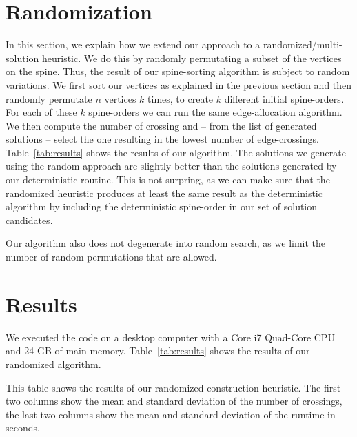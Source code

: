 \documentclass{scrartcl}
\begin{document}
\section{Randomization}
In this section, we explain how we extend our approach to a
randomized/multi-solution heuristic. We do this by randomly
permutating a subset of the vertices on the spine. Thus, the result of
our spine-sorting algorithm is subject to random variations. We first
sort our vertices as explained in the previous section and then
randomly permutate $n$ vertices $k$ times, to create $k$ different
initial spine-orders. For each of these $k$ spine-orders we can run
the same edge-allocation algorithm. We then compute the number of
crossing and -- from the list of generated solutions -- select the one
resulting in the lowest number of
edge-crossings. Table~\ref{tab:results} shows the results of our
algorithm. The solutions we generate using the random approach are
slightly better than the solutions generated by our deterministic
routine. This is not surpring, as we can make sure that the randomized
heuristic produces at least the same result as the deterministic
algorithm by including the deterministic spine-order in our set of
solution candidates.

Our algorithm also does not degenerate into random search, as we limit
the number of random permutations that are allowed.



\section{Results}
We executed the code on a desktop computer with a Core i7 Quad-Core
CPU and 24 GB of main memory. Table~\ref{tab:results} shows the
results of our randomized algorithm.

\begin{table}[h]

\centering

\caption{This table shows the results of our randomized construction
  heuristic. The first two columns show the mean and standard
  deviation of the number of crossings, the last two columns show the
  mean and standard deviation of the runtime in seconds.}
\label{tab:results}
\end{table}
\end{document}

